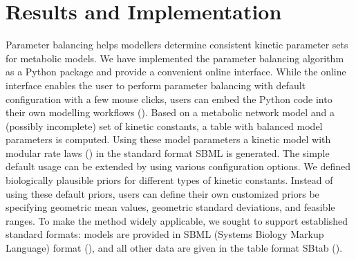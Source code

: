 \documentclass{bioinfo}
\begin{document}
\section{Results and Implementation}

Parameter balancing helps modellers determine consistent kinetic
parameter sets for metabolic models.  We have implemented the
parameter balancing algorithm as a Python package and provide a
convenient online interface. While the online interface enables the
user to perform parameter balancing with default configuration with a
few mouse clicks, users can embed the Python code into their own
modelling workflows (\cite{stanford2013systematic}). Based on a
metabolic network model and a (possibly incomplete) set of kinetic
constants, a table with balanced model parameters is computed. Using
these model parameters a kinetic model with modular rate laws
(\cite{liebermeister2010modular}) in the standard format SBML is
generated. The simple default usage can be extended by using various
configuration options. We defined biologically plausible priors for
different types of kinetic constants.  Instead of using these default
priors, users can define their own customized priors be specifying
geometric mean values, geometric standard deviations, and feasible
ranges. To make the method widely applicable, we sought to support
established standard formats: models are provided in SBML (Systems
Biology Markup Language) format (\cite{hucka2003systems}), and all other data are
given in the table format SBtab (\cite{lubitz2016sbtab}).
\end{document}
